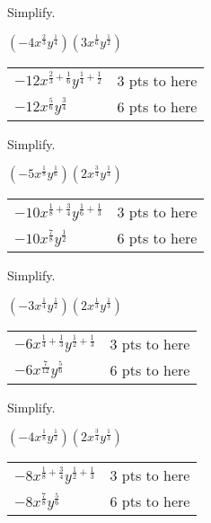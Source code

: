 {
	Simplify.\par
	$\displaystyle (-4x^{\frac{2}{3}}y^{\frac{1}{4}})(3x^{\frac{1}{6}}y^{\frac{1}{2}})$
}
{
	\begin{tabular}{l r}
	$\displaystyle -12x^{\frac{2}{3} +\frac{1}{6}}y^{\frac{1}{4}+\frac{1}{2}}$ & 3 pts to here\\
	$\displaystyle -12x^{\frac{5}{6}}y^{\frac{3}{4}}$ & 6 pts to here
	\end{tabular}
}

{
	Simplify.\par
	$\displaystyle (-5x^{\frac{1}{8}}y^{\frac{1}{6}})(2x^{\frac{3}{4}}y^{\frac{1}{3}})$
}
{
	\begin{tabular}{l r}
	$\displaystyle -10x^{\frac{1}{8} +\frac{3}{4}}y^{\frac{1}{6}+\frac{1}{3}}$ & 3 pts to here\\
	$\displaystyle -10x^{\frac{7}{8}}y^{\frac{1}{2}}$ & 6 pts to here
	\end{tabular}
}

{
	Simplify.\par
	$\displaystyle (-3x^{\frac{1}{4}}y^{\frac{1}{2}})(2x^{\frac{1}{3}}y^{\frac{1}{3}})$
}
{
	\begin{tabular}{l r}
	$\displaystyle -6x^{\frac{1}{4} +\frac{1}{3}}y^{\frac{1}{2}+\frac{1}{3}}$ & 3 pts to here\\
	$\displaystyle -6x^{\frac{7}{12}}y^{\frac{5}{6}}$ & 6 pts to here
	\end{tabular}
}

{
	Simplify.\par
	$\displaystyle (-4x^{\frac{1}{8}}y^{\frac{1}{2}})(2x^{\frac{3}{4}}y^{\frac{1}{3}})$
}
{
	\begin{tabular}{l r}
	$\displaystyle -8x^{\frac{1}{8} +\frac{3}{4}}y^{\frac{1}{2}+\frac{1}{3}}$ & 3 pts to here\\
	$\displaystyle -8x^{\frac{7}{8}}y^{\frac{5}{6}}$ & 6 pts to here
	\end{tabular}
}
